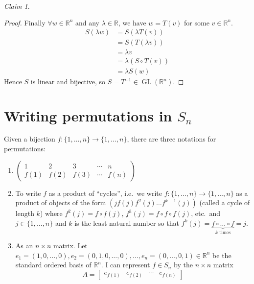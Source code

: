 \documentclass[12pt,letterpaper,DIV=11,final]{scrartcl}
\theoremstyle{plain}
\theoremstyle{definition}
\theoremstyle{remark}
\newtheorem{claim}{Claim}
\DeclareMathOperator{\gl}{GL} %
\begin{document}
\begin{claim}
\begin{proof}
    Finally $\forall w \in \mathbb{R}^n$ and any $\lambda \in \mathbb{R}$, we have $w = T(v)$ for some $v \in \mathbb{R}^n$.
    \begin{align*}
      S(\lambda w) &= S(\lambda T(v)) \\
                   &= S(T(\lambda v)) \\
                   &= \lambda v \\
                   &= \lambda (S \circ T(v)) \\
                   &= \lambda S(w)
    \end{align*}
    Hence $S$ is linear and bijective, so $S = T^{-1} \in \gl(\mathbb{R}^n)$.
  \end{proof}
\end{claim}

\section{Writing permutations in $S_n$}

Given a bijection $f : \{ 1, \dots, n \} \to \{ 1, \dots, n \}$, there are three notations for permutations:
\begin{enumerate}
  \item $\begin{pmatrix}
      1    & 2    & 3    & \cdots & n \\
      f(1) & f(2) & f(3) & \cdots & f(n)
    \end{pmatrix}$

  \item To write $f$ as a product of \enquote{cycles},
    i.e.\ we write $f : \{ 1, \dots, n \} \to \{ 1, \dots, n \}$ as a product of objects of the form $(j f(j) f^2(j) \dots f^{k - 1}(j))$ (called a cycle of length $k$) where $f^2(j) = f \circ f(j)$, $f^3(j) = f \circ f \circ f(j)$, etc.\
    and $j \in \{1, \dots, n\}$ and $k$ is the least natural number so that $f^k(j) = \underbrace{f \circ \dots \circ f}_\text{$k$ times} = j$.

  \item As an $n \times n$ matrix.
    Let $e_1 = (1, 0, \dots, 0), e_2 = (0, 1, 0, \dots, 0), \dots, e_n = (0, \dots, 0, 1) \in \mathbb{R}^n$ be the standard ordered basis of $\mathbb{R}^n$.
    I can represent $f \in S_n$ by the $n \times n$ matrix \begin{displaymath}
      A = \begin{bmatrix}
        e_{f(1)} & e_{f(2)} & \cdots & e_{f(n)}
      \end{bmatrix}
    \end{displaymath}
\end{enumerate}
\end{document}
